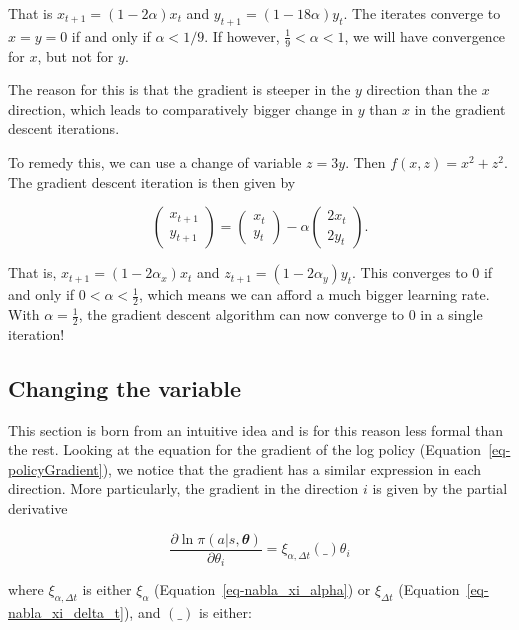 \documentclass[
  letterpaper,
]{report}
\theoremstyle{definition}
\theoremstyle{plain}
\theoremstyle{definition}
\theoremstyle{remark}
\begin{document}
That is \(x_{t+1} = (1-2\alpha)x_t\) and \(y_{t+1} = (1-18\alpha)y_t\).
The iterates converge to \(x=y=0\) if and only if \(\alpha<1/9\). If
however, \(\frac{1}{9}<\alpha<1\), we will have convergence for \(x\),
but not for \(y\).

The reason for this is that the gradient is steeper in the \(y\)
direction than the \(x\) direction, which leads to comparatively bigger
change in \(y\) than \(x\) in the gradient descent iterations.

To remedy this, we can use a change of variable \(z = 3y\). Then
\(f(x,z) = x^2 + z^2\). The gradient descent iteration is then given by

\[
\begin{pmatrix}
x_{t+1}\\
y_{t+1}
\end{pmatrix} = \begin{pmatrix}
x_t\\
y_t
\end{pmatrix} - \alpha 
\begin{pmatrix}
2x_t\\
2y_t
\end{pmatrix}.
\]

That is, \(x_{t+1} = (1-2\alpha_x)x_t\) and
\(z_{t+1} = (1-2\alpha_y)y_t\). This converges to \(0\) if and only if
\(0<\alpha<\frac{1}{2}\), which means we can afford a much bigger
learning rate. With \(\alpha = \frac{1}{2}\), the gradient descent
algorithm can now converge to \(0\) in a single iteration!

\subsection{Changing the variable}\label{changing-the-variable}

This section is born from an intuitive idea and is for this reason less
formal than the rest. Looking at the equation for the gradient of the
log policy (Equation~\ref{eq-policyGradient}), we notice that the
gradient has a similar expression in each direction. More particularly,
the gradient in the direction \(i\) is given by the partial derivative

\[
\frac{\partial \ln \pi(a|s,\mathbfit{\theta})}{\partial \theta_i} = \xi_{\alpha,\Delta t} (\_) \theta_i
\]

where \(\xi_{\alpha,\Delta t}\) is either \(\xi_\alpha\)
(Equation~\ref{eq-nabla_xi_alpha}) or \(\xi_{\Delta t}\)
(Equation~\ref{eq-nabla_xi_delta_t}), and \((\_)\) is either:
\end{document}
